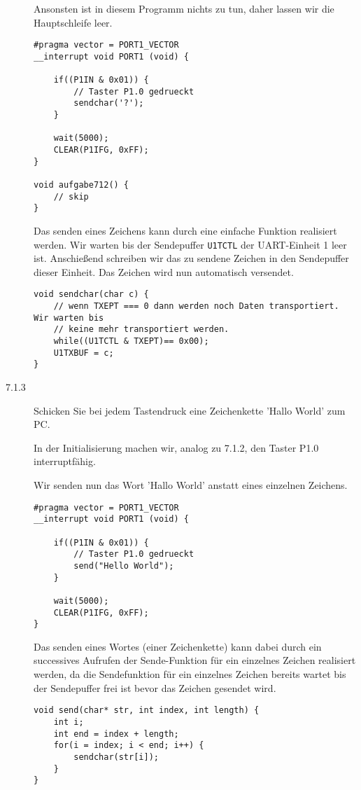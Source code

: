 \documentclass[11pt,a4paper,ngerman]{article}
\begin{document}
\begin{description}
Ansonsten ist in diesem Programm nichts zu tun, daher lassen wir die Hauptschleife leer.
\begin{lstlisting}
#pragma vector = PORT1_VECTOR
__interrupt void PORT1 (void) {

	if((P1IN & 0x01)) {
		// Taster P1.0 gedrueckt
		sendchar('?');
	}

	wait(5000);
	CLEAR(P1IFG, 0xFF);
}

void aufgabe712() {
	// skip
}
\end{lstlisting}

Das senden eines Zeichens kann durch eine einfache Funktion realisiert werden.
Wir warten bis der Sendepuffer \lstinline|U1TCTL| der UART-Einheit 1 leer ist. Anschießend schreiben wir
das zu sendene Zeichen in den Sendepuffer dieser Einheit. Das Zeichen wird nun automatisch versendet.
\begin{lstlisting}
void sendchar(char c) {
	// wenn TXEPT === 0 dann werden noch Daten transportiert. Wir warten bis
	// keine mehr transportiert werden.
	while((U1TCTL & TXEPT)== 0x00);
	U1TXBUF = c;
}
\end{lstlisting}

\item[7.1.3] Schicken Sie bei jedem Tastendruck eine Zeichenkette 'Hallo World' zum PC.

In der Initialisierung machen wir, analog zu 7.1.2, den Taster P1.0 interruptfähig.

Wir senden nun das Wort 'Hallo World' anstatt eines einzelnen Zeichens.
\begin{lstlisting}
#pragma vector = PORT1_VECTOR
__interrupt void PORT1 (void) {

	if((P1IN & 0x01)) {
		// Taster P1.0 gedrueckt
		send("Hello World");
	}

	wait(5000);
	CLEAR(P1IFG, 0xFF);
}
\end{lstlisting}

Das senden eines Wortes (einer Zeichenkette) kann dabei durch ein successives Aufrufen der Sende-Funktion für
ein einzelnes Zeichen realisiert werden, da die Sendefunktion für ein einzelnes Zeichen bereits wartet bis der Sendepuffer
frei ist bevor das Zeichen gesendet wird.

\begin{lstlisting}
void send(char* str, int index, int length) {
	int i;
	int end = index + length;
	for(i = index; i < end; i++) {
		sendchar(str[i]);	
	}
}
\end{lstlisting}
\end{description}
\end{document}
